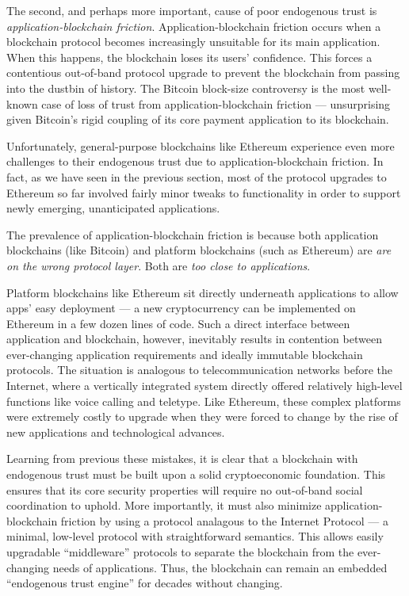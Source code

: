 \documentclass[headinclude,12pt]{scrbook}
\begin{document}
The second, and perhaps more important, cause of poor endogenous trust is \emph{application-blockchain friction}. Application-blockchain friction occurs when a blockchain protocol becomes increasingly unsuitable for its main application. When this happens, the blockchain loses its users' confidence. This forces a contentious out-of-band protocol upgrade to prevent the blockchain from passing into the dustbin of history. The Bitcoin block-size controversy is the most well-known case of loss of trust from application-blockchain friction --- unsurprising given Bitcoin's rigid coupling of its core payment application to its blockchain.

Unfortunately, general-purpose blockchains like Ethereum experience even more challenges to their endogenous trust due to application-blockchain friction. In fact, as we have seen in the previous section, most of the protocol upgrades to Ethereum so far involved fairly minor tweaks to functionality in order to support newly emerging, unanticipated applications.

The prevalence of application-blockchain friction is because both application blockchains (like Bitcoin) and platform blockchains (such as Ethereum) are \textit{are on the wrong protocol layer}. Both are \emph{too close to applications}.

Platform blockchains like Ethereum sit directly underneath applications to allow apps' easy deployment --- a new cryptocurrency can be implemented on Ethereum in a few dozen lines of code. Such a direct interface between application and blockchain, however, inevitably results in contention between ever-changing application requirements and ideally immutable blockchain protocols. The situation is analogous to telecommunication networks before the Internet, where a vertically integrated system directly offered relatively high-level functions like voice calling and teletype. Like Ethereum, these complex platforms were extremely costly to upgrade when they were forced to change by the rise of new applications and technological advances.

Learning from previous these mistakes, it is clear that a blockchain with endogenous trust must be built upon a solid cryptoeconomic foundation. This ensures that its core security properties will require no out-of-band social coordination to uphold. More importantly, it must also minimize application-blockchain friction by using a protocol analagous to the Internet Protocol --- a minimal, low-level protocol with straightforward semantics. This allows easily upgradable ``middleware'' protocols to separate the blockchain from the ever-changing needs of applications. Thus, the blockchain can remain an embedded ``endogenous trust engine'' for decades without changing.
\end{document}

